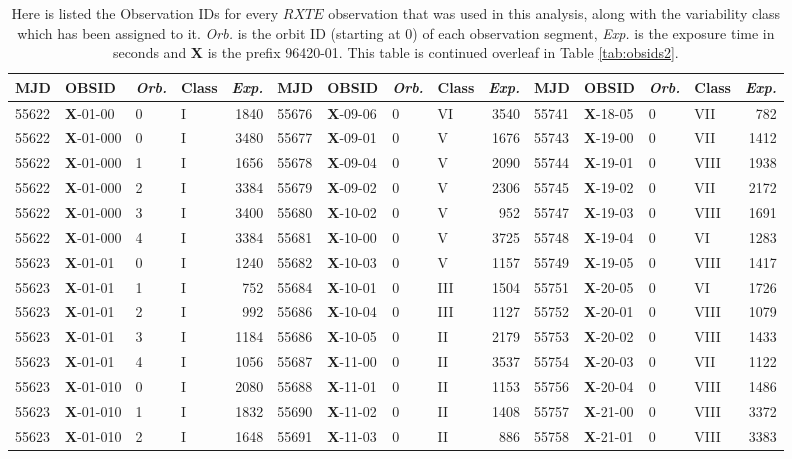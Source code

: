\begin{table*}
\caption{Here is listed the Observation IDs for every $RXTE$ observation that was used in this analysis, along with the variability class which has been assigned to it.  \textit{Orb.} is the orbit ID (starting at 0) of each observation segment, \textit{Exp.} is the exposure time in seconds and \textbf{X} is the prefix 96420-01.  This table is continued overleaf in Table \ref{tab:obsids2}.}
\label{tab:obsids}
\begin{tabular}{llllrllllrllllr}
\hline
\hline
MJD&OBSID&\textit{Orb.}&Class&\textit{Exp.}&MJD&OBSID&\textit{Orb.}&Class&\textit{Exp.}&MJD&OBSID&\textit{Orb.}&Class&\textit{Exp.}\\
\hline
55622&\textbf{X}-01-00&0&I&1840&55676&\textbf{X}-09-06&0&VI&3540&55741&\textbf{X}-18-05&0&VII&782\\
55622&\textbf{X}-01-000&0&I&3480&55677&\textbf{X}-09-01&0&V&1676&55743&\textbf{X}-19-00&0&VII&1412\\
55622&\textbf{X}-01-000&1&I&1656&55678&\textbf{X}-09-04&0&V&2090&55744&\textbf{X}-19-01&0&VIII&1938\\
55622&\textbf{X}-01-000&2&I&3384&55679&\textbf{X}-09-02&0&V&2306&55745&\textbf{X}-19-02&0&VII&2172\\
55622&\textbf{X}-01-000&3&I&3400&55680&\textbf{X}-10-02&0&V&952&55747&\textbf{X}-19-03&0&VIII&1691\\
55622&\textbf{X}-01-000&4&I&3384&55681&\textbf{X}-10-00&0&V&3725&55748&\textbf{X}-19-04&0&VI&1283\\
55623&\textbf{X}-01-01&0&I&1240&55682&\textbf{X}-10-03&0&V&1157&55749&\textbf{X}-19-05&0&VIII&1417\\
55623&\textbf{X}-01-01&1&I&752&55684&\textbf{X}-10-01&0&III&1504&55751&\textbf{X}-20-05&0&VI&1726\\
55623&\textbf{X}-01-01&2&I&992&55686&\textbf{X}-10-04&0&III&1127&55752&\textbf{X}-20-01&0&VIII&1079\\
55623&\textbf{X}-01-01&3&I&1184&55686&\textbf{X}-10-05&0&II&2179&55753&\textbf{X}-20-02&0&VIII&1433\\
55623&\textbf{X}-01-01&4&I&1056&55687&\textbf{X}-11-00&0&II&3537&55754&\textbf{X}-20-03&0&VII&1122\\
55623&\textbf{X}-01-010&0&I&2080&55688&\textbf{X}-11-01&0&II&1153&55756&\textbf{X}-20-04&0&VIII&1486\\
55623&\textbf{X}-01-010&1&I&1832&55690&\textbf{X}-11-02&0&II&1408&55757&\textbf{X}-21-00&0&VIII&3372\\
55623&\textbf{X}-01-010&2&I&1648&55691&\textbf{X}-11-03&0&II&886&55758&\textbf{X}-21-01&0&VIII&3383\\

\end{tabular}
\end{table*}
